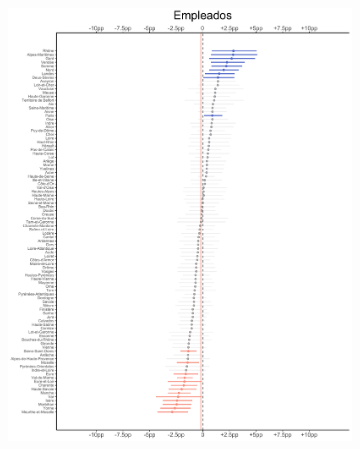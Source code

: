\begin{figure}
	\centering
	\begin{subfigure}{0.45\textwidth}
	\includegraphics[width = \textwidth]{Figs/Efectos/Efectos_CSP5_Modelo_H}
	\end{subfigure}
	~
	\begin{subfigure}{0.45\textwidth}

\end{subfigure}
\end{figure}
